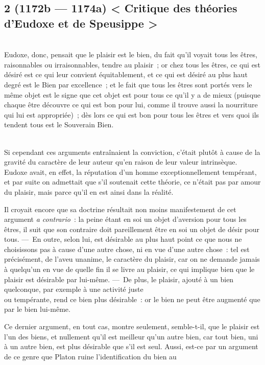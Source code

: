 \documentclass[french,twoside]{book} %
\begin{document}
\subsection[{2 (1172b — 1174a) < Critique des théories d’Eudoxe et de Speusippe >}]{2 (1172b — 1174a) < Critique des théories d’Eudoxe et de Speusippe >}
\noindent \\
Eudoxe, donc, pensait que le plaisir est le bien, du fait qu’il voyait tous les êtres, raisonnables ou irraisonnables, tendre au plaisir ; or chez tous les êtres, ce qui est désiré est ce qui leur convient équitablement, et ce qui est désiré au plus haut degré est le Bien par excellence ; et le fait que tous les êtres sont portés vers le même objet est le signe que cet objet est pour tous ce qu’il y a de mieux (puisque chaque être découvre ce qui est bon pour lui, comme il trouve aussi la nourriture qui lui est appropriée) ; dès lors ce qui est bon pour tous les êtres et vers quoi ils tendent tous est le Souverain Bien.\par
\\
Si cependant ces arguments entraînaient la conviction, c’était plutôt à cause de la gravité du caractère de leur auteur qu’en raison de leur valeur intrinsèque. Eudoxe avait, en effet, la réputation d’un homme exceptionnellement tempérant, et par suite on admettait que s’il soutenait cette théorie, ce n’était pas par amour du plaisir, mais parce qu’il en est ainsi dans la réalité.\par
Il croyait encore que sa doctrine résultait non moins manifestement de cet argument {\itshape a contrario} : la peine étant en soi un objet d’aversion pour tous les êtres, il suit que son contraire doit pareillement être en soi un objet de désir pour \\
tous. — En outre, selon lui, est désirable au plus haut point ce que nous ne choisissons pas à cause d’une autre chose, ni en vue d’une autre chose : tel est précisément, de l’aveu unanime, le caractère du plaisir, car on ne demande jamais à quelqu’un en vue de quelle fin il se livre au plaisir, ce qui implique bien que le plaisir est désirable par lui-même. — De plus, le plaisir, ajouté à un bien quelconque, par exemple à une activité juste \\
ou tempérante, rend ce bien plus désirable : or le bien ne peut être augmenté que par le bien lui-même.\par
Ce dernier argument, en tout cas, montre seulement, semble-t-il, que le plaisir est l’un des biens, et nullement qu’il est meilleur qu’un autre bien, car tout bien, uni à un autre bien, est plus désirable que s’il est seul. Aussi, est-ce par un argument de ce genre que Platon ruine l’identification du bien au \\
\end{document}
